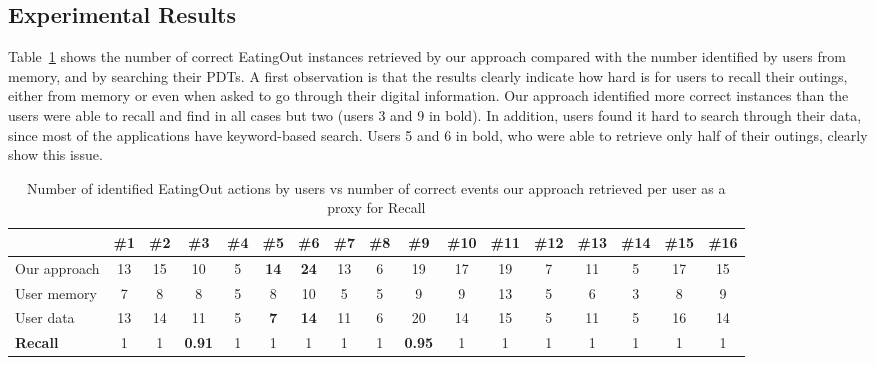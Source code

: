 \documentclass[11pt]{article}
\begin{document}
\subsection{Experimental Results}

Table~\ref{table:events-retrieved} shows the number of correct EatingOut instances retrieved by our approach compared with the number identified by users from memory, and by searching their PDTs. A first observation is that the results clearly indicate how hard is for users to recall their outings, either from memory or even when asked to go through their digital information. 
Our approach identified more correct instances than the users were able to recall and find in all cases but two (users 3 and 9 in bold). In addition, users found it hard to search through their data, since most of the applications have keyword-based search. Users 5 and 6 in bold, who were able to retrieve only half of their outings, clearly show this issue. 

\begin{table}
\scriptsize
\begin{center}
{
\begin{tabular}{|l||c|c|c|c|c|c|c|c|c|c|c|c|c|c|c|c|}
\hline
  & \#1 & \#2 & \#3 & \#4 & \#5 & \#6 & \#7 & \#8 & \#9 & \#10 & \#11 & \#12 & \#13 & \#14 & \#15 & \#16\\
\hline
\hline
Our approach  & 13 & 15 & 10 & 5 & \textbf{14} & \textbf{24} & 13 & 6 & 19 & 17 & 19 & 7  & 11 & 5 & 17 & 15\\
\hline
User memory  & 7  & 8  &  8 & 5 & 8 & 10 & 5 & 5 & 9 & 9 & 13 & 5 & 6 & 3  & 8 & 9\\
\hline
User data  & 13  & 14  &  11 & 5 & \textbf{7} & \textbf{14} & 11 & 6 & 20 & 14 & 15 & 5 & 11 & 5  & 16 & 14\\
\hline
\hline
\textbf{Recall}  & 1 & 1 & \textbf{0.91} & 1 & 1 & 1 & 1 & 1 & \textbf{0.95} & 1 & 1 & 1  & 1 & 1 & 1 & 1\\
\hline
\end{tabular}
}
\caption{Number of identified EatingOut actions by users vs number of correct events our approach retrieved per user as a proxy for Recall}
\label{table:events-retrieved}
\end{center}
\end{table}
\end{document}
